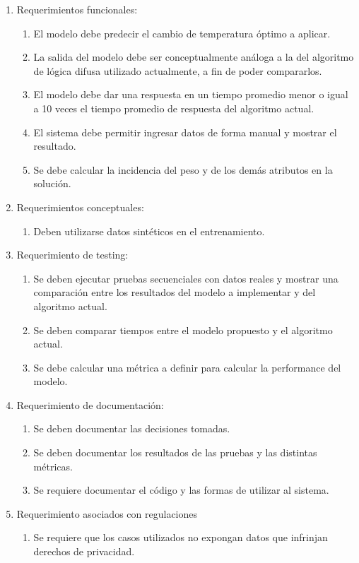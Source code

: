 \documentclass[
11pt, %
]{charter}
\begin{document}
\begin{enumerate}
	\item Requerimientos funcionales:
		\begin{enumerate}
			\item El modelo debe predecir el cambio de temperatura óptimo a aplicar.
			\item La salida del modelo debe ser conceptualmente análoga a la del algoritmo de lógica difusa utilizado actualmente, a fin de poder compararlos.
			\item El modelo debe dar una respuesta en un tiempo promedio menor o igual a 10 veces el tiempo promedio de respuesta del algoritmo actual.
			\item El sistema debe permitir ingresar datos de forma manual y mostrar el resultado.
			\item Se debe calcular la incidencia del peso y de los demás atributos en la solución.
		\end{enumerate}
	\item Requerimientos conceptuales:
		\begin{enumerate}
			\item Deben utilizarse datos sintéticos en el entrenamiento.
		\end{enumerate}
	\item Requerimiento de testing:
		\begin{enumerate}
			\item Se deben ejecutar pruebas secuenciales con datos reales y mostrar una comparación entre los resultados del modelo a implementar y del algoritmo actual.
			\item Se deben comparar tiempos entre el modelo propuesto y el algoritmo actual.
			\item Se debe calcular una métrica a definir para calcular la performance del modelo.
		\end{enumerate}
	\item Requerimiento de documentación:
		\begin{enumerate}
			\item Se deben documentar las decisiones tomadas.
			\item Se deben documentar los resultados de las pruebas y las distintas métricas.
			\item Se requiere documentar el código y las formas de utilizar al sistema.
		\end{enumerate}
	\item Requerimiento asociados con regulaciones
		\begin{enumerate}
			\item Se requiere que los casos utilizados no expongan datos que infrinjan derechos de privacidad.
		\end{enumerate}
\end{enumerate}
\end{document}
